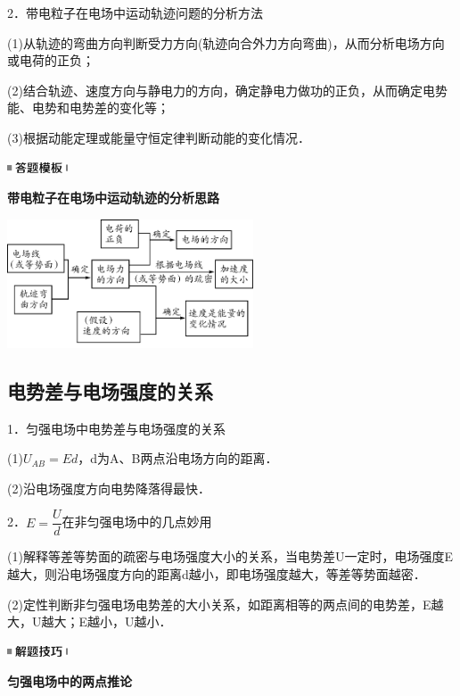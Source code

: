\documentclass[cn,10.5pt,chinese,mac,chinesefont=founder]{elegantbook}
\begin{document}
2．带电粒子在电场中运动轨迹问题的分析方法

(1)从轨迹的弯曲方向判断受力方向(轨迹向合外力方向弯曲)，从而分析电场方向或电荷的正负；

(2)结合轨迹、速度方向与静电力的方向，确定静电力做功的正负，从而确定电势能、电势和电势差的变化等；

(3)根据动能定理或能量守恒定律判断动能的变化情况．

\begin{center}\includegraphics[width=0.70833in,height=0.125in]{media/image25.png}

\textbf{带电粒子在电场中运动轨迹的分析思路}
\end{center}


\begin{center}\includegraphics[width=2.875in,height=1.5in]{media/image280.png}\end{center}

\newpage
\subsection{电势差与电场强度的关系}

1．匀强电场中电势差与电场强度的关系

(1)$U_{A B}=E d$，d为A、B两点沿电场方向的距离．

(2)沿电场强度方向电势降落得最快．

2．$E=\dfrac{U}{d}$在非匀强电场中的几点妙用

(1)解释等差等势面的疏密与电场强度大小的关系，当电势差U一定时，电场强度E越大，则沿电场强度方向的距离d越小，即电场强度越大，等差等势面越密．

(2)定性判断非匀强电场电势差的大小关系，如距离相等的两点间的电势差，E越大，U越大；E越小，U越小．

\begin{center}\includegraphics[width=0.70833in,height=0.125in]{media/image37.png}

\textbf{匀强电场中的两点推论}
\end{center}
\end{document}
